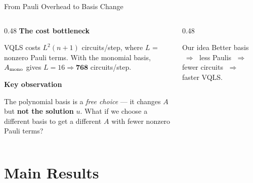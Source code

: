 \documentclass{beamer}
\begin{document}
\begin{frame}{From Pauli Overhead to Basis Change}

  \begin{columns}[T]
    \begin{column}{0.48\textwidth}
      \textbf{The cost bottleneck}

      VQLS costs $L^2(n+1)$ circuits/step, where $L$ = nonzero Pauli terms.
      With the monomial basis, $A_{\rm mono}$ gives $L=16 \Rightarrow \mathbf{768}$ circuits/step.

      \vspace{10pt}
      \textbf{Key observation}

      The polynomial basis is a \emph{free choice} —
      it changes $A$ but \textbf{not the solution} $u$. What if we choose a different basis to get a different $A$ with fewer nonzero Pauli terms?
    \end{column}
    \begin{column}{0.48\textwidth}

      \vspace{8pt}
      \begin{alertblock}{Our idea}
        Better basis $\;\Rightarrow\;$ less Paulis $\;\Rightarrow\;$ fewer circuits $\;\Rightarrow\;$ faster VQLS.
      \end{alertblock}
    \end{column}
  \end{columns}
\end{frame}

\section{Main Results}
\end{document}
